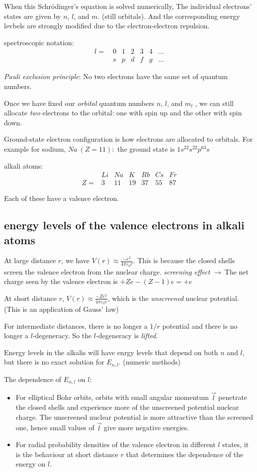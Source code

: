 \documentclass[10pt, a4paper, twocolumn]{article}
\newcommand{\deff}[1]{\par \noindent \textit{#1}: }
\newcommand{\pfs}{\ensuremath{\varepsilon _0}}
\newcommand{\arr}{\ensuremath{\longrightarrow\ }}
\newcommand{\n}{\par \noindent}
\begin{document}
When this Schr\"{o}dinger's equation is solved numerically, The individual electrons' states are given by $n$, $l$, and $m$. (still orbitals). And the corresponding energy levbels are strongly modified due to the electron-electron repulsion.

spectroscopic notation:
\[ \begin{matrix}
l=&0&1&2&3&4&\ldots \\
\phantom{1=}&s&p&d&f&g&\ldots \end{matrix} \]

\deff{Pauli exclusion principle}
No two electrons have the same set of quantum numbers.

Once we have fixed our \emph{orbital} quantum numbers 
$n$, $l$, and $m_l$
, we can still allocate \emph{two} electrons to the orbital: one with spin up and the other with spin down.

Ground-state electron configuration is how electrons are allocated to orbitals. For example for sodium,
$ Na\ (Z=11):$ the ground state is $1s^22s^22p^63s$

alkali atoms:
\[\begin{matrix}
\phantom{Z=} & Li & Na & K & Rb & Cs & Fr
\\ Z= & 3 & 11 & 19 & 37 & 55 &87 \end{matrix} \]

Each of these have a valence electron.
\subsection{energy levels of the valence electrons in alkali atoms}

At large distance $r$, we have $V(r) \approx \frac{-e^2}{4 \pi \pfs r}$. This is because the closed shells screen the valence electron from the nuclear charge.
\emph{screening effect} \arr The net charge seen by the valence electron is $+Ze - (Z-1)e = +e$

At short distance $r$, $V(r) \approx \frac{-Ze^2}{4\pi \pfs r} $, which is the \emph{unscreened} nuclear potential. (This is an application of Gauss' law)

For intermediate distances, there is no longer a $1/r$ potential and there is no longer a $l$-degeneracy. So the $l$-degeneracy is \emph{lifted}. 

Energy levels in the alkalis will have enrgy levels that depend on both $n$ and $l$, but there is no exact solution for $E_{n,l}$. (numeric methods)

\n The dependence of $E_{n,l}$ on $l$:
\begin{itemize}
\item For elliptical Bohr orbits, orbits with small angular momentum $\vec l$ penetrate the closed shells and experience more of the unscreened potential nuclear charge. The unscreened nuclear potential is more attractive than the screened one, hence small values of $\vec l$ give more negative energies.
\item For radial probability densities of the valence electron in different $l$ states, it is the behaviour at short distance $r$ that determines the dependence of the energy on $l$.
\end{itemize}
\end{document}
